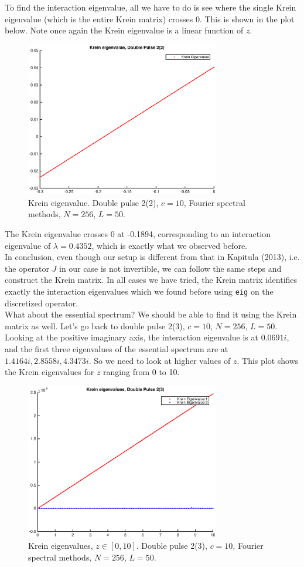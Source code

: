 \documentclass[12pt]{article}
\begin{document}
To find the interaction eigenvalue, all we have to do is see where the single Krein eigenvalue (which is the entire Krein matrix) crosses 0. This is shown in the plot below. Note once again the Krein eigenvalue is a linear function of $z$. 

\begin{figure}[H]
	\includegraphics[width=8.5cm]{dp1kreineig1}
	\caption{Krein eigenvalue. Double pulse 2(2), $c = 10$, Fourier spectral methods, $N = 256$, $L = 50$. }
\end{figure}

The Krein eigenvalue crosses 0 at -0.1894, corresponding to an interaction eigenvalue of $\lambda = 0.4352$, which is exactly what we observed before.\\

In conclusion, even though our setup is different from that in Kapitula (2013), i.e. the operator $J$ in our case is not invertible, we can follow the same steps and construct the Krein matrix. In all cases we have tried, the Krein matrix identifies exactly the interaction eigenvalues which we found before using \texttt{eig} on the discretized operator.\\

What about the essential spectrum? We should be able to find it using the Krein matrix as well. Let's go back to double pulse 2(3), $c = 10$, $N = 256$, $L = 50$. Looking at the positive imaginary axis, the interaction eigenvalue is at $0.0691i$, and the first three eigenvalues of the essential spectrum are at $1.4164i, 2.8558i, 4.3473i$. So we need to look at higher values of $z$. This plot shows the Krein eigenvalues for $z$ ranging from 0 to 10.

\begin{figure}[H]
	\includegraphics[width=8.5cm]{dp2kreineig3.eps}
	\caption{Krein eigenvalues, $z \in [0, 10]$. Double pulse 2(3), $c = 10$, Fourier spectral methods, $N =  256$, $L = 50$. }
\end{figure}
\end{document}
